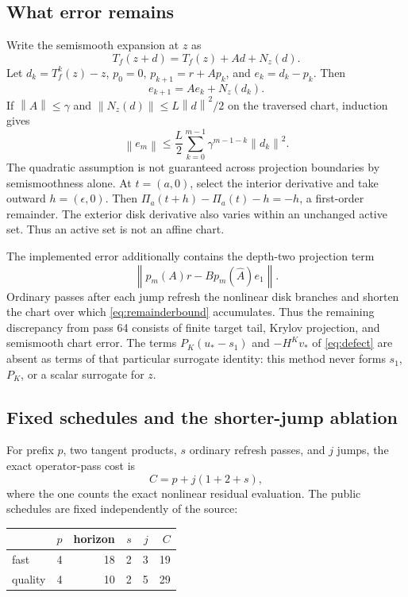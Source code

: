 \documentclass[10pt,twocolumn]{article}
\theoremstyle{definition}\newtheorem{remark}[proposition]{Remark}
\newcommand{\norm}[1]{\left\lVert#1\right\rVert}
\newcommand{\Tf}{T_f}
\begin{document}
\subsection{What error remains}

Write the semismooth expansion at $z$ as
\begin{equation}
\Tf(z+d)=\Tf(z)+Ad+N_z(d).
\end{equation}
Let $d_k=\Tf^k(z)-z$, $p_0=0$, $p_{k+1}=r+Ap_k$, and
$e_k=d_k-p_k$.  Then
\begin{equation}
e_{k+1}=Ae_k+N_z(d_k).
\end{equation}
If $\norm A\le\gamma$ and $\norm{N_z(d)}\le L\norm d^2/2$ on the traversed
chart, induction gives
\begin{equation}
\norm{e_m}\le \frac{L}{2}\sum_{k=0}^{m-1}
\gamma^{m-1-k}\norm{d_k}^2.
\label{eq:remainderbound}
\end{equation}
The quadratic assumption is not guaranteed across projection boundaries by
semismoothness alone. At $t=(a,0)$, select the interior derivative and take
outward $h=(\epsilon,0)$. Then
$\Pi_a(t+h)-\Pi_a(t)-h=-h$, a first-order remainder. The exterior disk
derivative also varies within an unchanged active set. Thus an active set
is not an affine chart.

The implemented error additionally contains the depth-two projection term
\begin{equation}
\norm{p_m(A)r-Bp_m(\widehat A)e_1}.
\end{equation}
Ordinary passes after each jump refresh the nonlinear disk branches and
shorten the chart over which \eqref{eq:remainderbound} accumulates.  Thus the
remaining discrepancy from pass 64 consists of finite target tail, Krylov
projection, and semismooth chart error.  The terms $P_K(u_*-s_1)$ and
$-H^Kv_*$ of \eqref{eq:defect} are absent as terms of that particular surrogate identity: this method never
forms $s_1$, $P_K$, or a scalar surrogate for $z$.

\subsection{Fixed schedules and the shorter-jump ablation}

For prefix $p$, two tangent products, $s$ ordinary refresh passes, and $j$
jumps, the exact operator-pass cost is
\begin{equation}
C=p+j(1+2+s),
\label{eq:cost}
\end{equation}
where the one counts the exact nonlinear residual evaluation.  The public
schedules are fixed independently of the source:
\begin{center}\small
\begin{tabular}{lrrrrr}\toprule
&$p$& horizon &$s$&$j$&$C$\\\midrule
fast&4&18&2&3&19\\
quality&4&10&2&5&29\\\bottomrule
\end{tabular}
\end{center}
\end{document}

